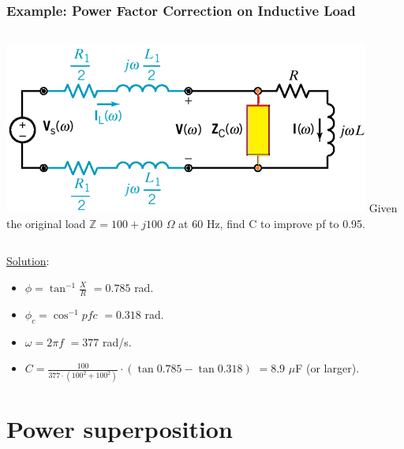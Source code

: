 \documentclass{beamer}
\begin{document}
\begin{frame}[fragile]
\frametitle{Example: Power Factor Correction on Inductive Load}

\vspace{-0.5cm}

\begin{columns}[c]
\includegraphics[width=\textwidth]{src/pfc.png}
%
Given the original load $\mathbb{Z} = 100 + j100$ $\Omega$
at 60 Hz, find C to improve pf to 0.95.

\end{columns}
\underline{Solution}:
\begin{itemize}
\item $\phi = \tan^{-1} \frac{X}{R}$ 
$= 0.785$ rad.
\item $\phi_c = \cos^{-1} pfc$
$= 0.318$ rad.
\item $\omega = 2\pi f$
$= 377$ rad/s.
\item $C = \frac{100}{377 \cdot (100^2 + 100^2)} \cdot \left( \tan 0.785 - \tan 0.318 \right)$
$=8.9$ $\mu$F (or larger).
\end{itemize}

\end{frame}


\section{Power superposition}
\end{document}
